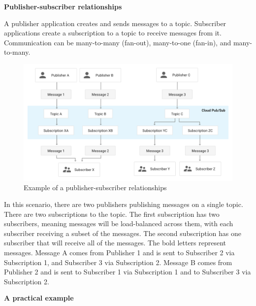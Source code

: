 \vspace{0.4cm}
\textbf{Publisher-subscriber relationships}
\vspace{0.4cm}

A publisher application creates and sends messages to a topic. Subscriber applications create a subscription to a topic to receive messages from it. Communication can be many-to-many (fan-out), many-to-one (fan-in), and many-to-many.

\begin{figure}[htp]
    \centering
    \includegraphics[width = 15.5cm]{figures/pubsub_img1}
    \caption{Example of a publisher-subscriber relationships}
\end{figure}

In this scenario, there are two publishers publishing messages on a single topic. There are two subscriptions to the topic. The first subscription has two subscribers, meaning messages will be load-balanced across them, with each subscriber receiving a subset of the messages. The second subscription has one subscriber that will receive all of the messages. The bold letters represent messages. Message A comes from Publisher 1 and is sent to Subscriber 2 via Subscription 1, and Subscriber 3 via Subscription 2. Message B comes from Publisher 2 and is sent to Subscriber 1 via Subscription 1 and to Subscriber 3 via Subscription 2.

\vspace{0.4cm}
\textbf{A practical example}
\vspace{0.4cm}

